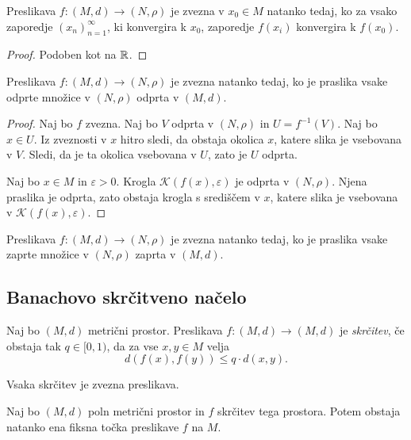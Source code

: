 \documentclass[12pt, a4paper]{article}
\begin{document}
\begin{trditev}
Preslikava $f\colon (M,d)\to(N,\rho)$ je zvezna v $x_0\in M$ natanko tedaj, ko za vsako zaporedje $(x_n)_{n=1}^\infty$, ki konvergira k $x_0$, zaporedje $f(x_i)$ konvergira k $f(x_0)$.
\end{trditev}

\begin{proof}
Podoben kot na $\mathbb{R}$.
\end{proof}

\begin{izrek}
Preslikava $f\colon (M,d)\to(N,\rho)$ je zvezna natanko tedaj, ko je praslika vsake odprte množice v $(N,\rho)$ odprta v $(M,d)$.
\end{izrek}

\begin{proof}
Naj bo $f$ zvezna. Naj bo $V$ odprta v $(N,\rho)$ in $U=f^{-1}(V)$. Naj bo $x\in U$. Iz zveznosti v $x$ hitro sledi, da obstaja okolica $x$, katere slika je vsebovana v $V$. Sledi, da je ta okolica vsebovana v $U$, zato je $U$ odprta.

Naj bo $x\in M$ in $\varepsilon>0$. Krogla $\mathcal{K}(f(x),\varepsilon)$ je odprta v $(N,\rho)$. Njena praslika je odprta, zato obstaja krogla s središčem v $x$, katere slika je vsebovana v $\mathcal{K}(f(x),\varepsilon)$.
\end{proof}

\begin{posledica}
Preslikava $f\colon (M,d)\to(N,\rho)$ je zvezna natanko tedaj, ko je praslika vsake zaprte množice v $(N,\rho)$ zaprta v $(M,d)$.
\end{posledica}

\newpage

\subsection{Banachovo skrčitveno načelo}

\begin{definicija}
Naj bo $(M,d)$ metrični prostor. Preslikava $f\colon(M,d)\to(M,d)$ je \emph{skrčitev}, če obstaja tak $q\in[0,1)$, da za vse $x,y\in M$ velja
\[
d(f(x),f(y))\leq q\cdot d(x,y).
\]
\end{definicija}

\begin{opomba}
Vsaka skrčitev je zvezna preslikava.
\end{opomba}

\begin{izrek}[Banach]
Naj bo $(M,d)$ poln metrični prostor in $f$ skrčitev tega prostora. Potem obstaja natanko ena fiksna točka preslikave $f$ na $M$.
\end{izrek}
\end{document}
